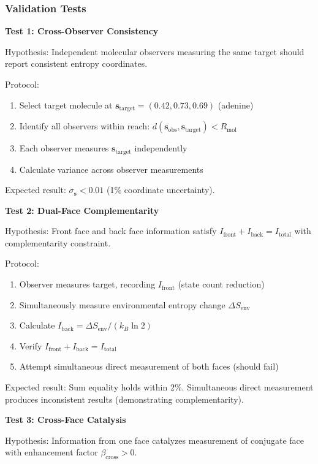 \begin{theorem}
\subsubsection{Validation Tests}

\textbf{Test 1: Cross-Observer Consistency}

Hypothesis: Independent molecular observers measuring the same target should report consistent entropy coordinates.

Protocol:
\begin{enumerate}
\item Select target molecule at $\mathbf{s}_{\text{target}} = (0.42, 0.73, 0.69)$ (adenine)
\item Identify all observers within reach: $d(\mathbf{s}_{\text{obs}}, \mathbf{s}_{\text{target}}) < R_{\text{mol}}$
\item Each observer measures $\mathbf{s}_{\text{target}}$ independently
\item Calculate variance across observer measurements
\end{enumerate}

Expected result: $\sigma_{\mathbf{s}} < 0.01$ (1\% coordinate uncertainty).

\textbf{Test 2: Dual-Face Complementarity}

Hypothesis: Front face and back face information satisfy $I_{\text{front}} + I_{\text{back}} = I_{\text{total}}$ with complementarity constraint.

Protocol:
\begin{enumerate}
\item Observer measures target, recording $I_{\text{front}}$ (state count reduction)
\item Simultaneously measure environmental entropy change $\Delta S_{\text{env}}$
\item Calculate $I_{\text{back}} = \Delta S_{\text{env}}/(k_B \ln 2)$
\item Verify $I_{\text{front}} + I_{\text{back}} = I_{\text{total}}$
\item Attempt simultaneous direct measurement of both faces (should fail)
\end{enumerate}

Expected result: Sum equality holds within 2\%. Simultaneous direct measurement produces inconsistent results (demonstrating complementarity).

\textbf{Test 3: Cross-Face Catalysis}

Hypothesis: Information from one face catalyzes measurement of conjugate face with enhancement factor $\beta_{\text{cross}} > 0$.


\end{theorem}
